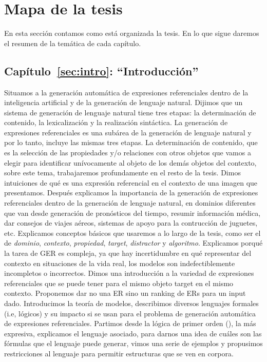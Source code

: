 \section{Mapa de la tesis}
\label{sec:mapadetesis}

En esta secci\'on contamos como est\'a organizada la tesis. En lo que sigue daremos el resumen de la tem\'atica de cada cap\'itulo.

\subsection{Cap\'itulo~\ref{sec:intro}: ``Introducci\'on''} 
Situamos a la generaci\'on autom\'atica de expresiones 
referenciales dentro de la inteligencia artificial y de la generaci\'on de lenguaje natural. Dijimos que un sistema de 
generaci\'on de lenguaje natural tiene tres etapas: la determinaci\'on de contenido, la lexicalizaci\'on y la realizaci\'on sint\'actica. La generaci\'on de expresiones referenciales es una sub\'area de la generaci\'on de lenguaje natural y por lo tanto, incluye las mismas tres etapas. La determinaci\'on de contenido, que es la selecci\'on de las propiedades y/o relaciones con otros objetos que vamos a elegir para identificar un\'ivocamente al objeto de los dem\'as objetos del contexto, sobre este tema, trabajaremos profundamente en el resto de la tesis. Dimos intuiciones de qu\'e es una expresi\'on referencial en el contexto de una imagen que presentamos. Despu\'es explicamos la importancia de la generaci\'on de expresiones referenciales dentro de la generaci\'on de lenguaje natural, en 
dominios diferentes que van desde generaci\'on de pron\'osticos del tiempo, resumir informaci\'on m\'edica, dar consejos de viajes a\'ereos, 
sistemas de apoyo para la contrucci\'on de juguetes, etc. Explicamos conceptos b\'asicos que usaremos a lo largo de la tesis, como ser el de {\it dominio}, {\it contexto}, {\it propiedad}, {\it target}, {\it distractor} y {\it algoritmo}. Explicamos porqu\'e la tarea de GER es compleja, ya que hay incertidumbre en qu\'e representar del contexto en situaciones de la vida real, los modelos son indefectiblemente incompletos o incorrectos. Dimos una introducci\'on a la variedad de expresiones referenciales que 
se puede tener para el mismo objeto target en el mismo contexto. Proponemos dar no una ER sino un ranking de ERs para un input dado.
Introducimos la teor\'ia de modelos, describimos diversos lenguajes formales (i.e, l\'ogicos) y su impacto si se usan para el problema de generaci\'on autom\'atica de expresiones referenciales.  Partimos desde la l\'ogica de primer orden (\FOL), la m\'as expresiva, explicamos el lenguaje asociado, para darnos una idea de cu\'ales son las f\'ormulas que el lenguaje puede generar, vimos una serie de ejemplos y propusimos restricciones al lenguaje para permitir estructuras que se ven en corpora.

